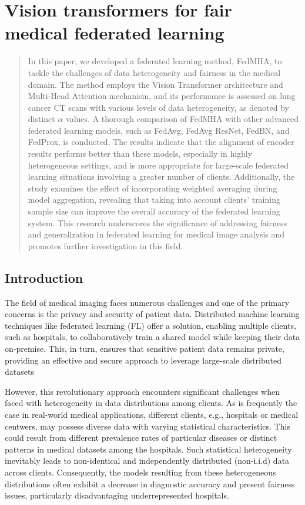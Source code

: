 


\chapter{Vision transformers for fair medical federated learning }



\begin{abstract}
In this paper, we developed a federated learning method, FedMHA, to tackle the challenges of data heterogeneity and fairness in the medical domain. The method employs the Vision Transformer architecture and Multi-Head Attention mechanism, and its performance is assessed on lung cancer CT scans with various levels of data heterogeneity, as denoted by distinct $\alpha$ values. A thorough comparison of FedMHA with other advanced federated learning models, such as FedAvg, FedAvg ResNet, FedBN, and FedProx, is conducted. The results indicate that the alignment of encoder results performs better than these models, especially in highly heterogeneous settings, and is more appropriate for large-scale federated learning situations involving a greater number of clients. Additionally, the study examines the effect of incorporating weighted averaging during model aggregation, revealing that taking into account clients' training sample size can improve the overall accuracy of the federated learning system. This research underscores the significance of addressing fairness and generalization in federated learning for medical image analysis and promotes further investigation in this field.
\end{abstract}


\newpage
\section{Introduction}

The field of medical imaging faces numerous challenges and one of the primary concerns is the privacy and security of patient data. Distributed machine learning techniques like federated learning (FL) offer a solution, enabling multiple clients, such as hospitals, to collaboratively train a shared model while keeping their data on-premise. This, in turn, ensures that sensitive patient data remains private, providing an effective and secure approach to leverage large-scale distributed datasets

However, this revolutionary approach encounters significant challenges when faced with heterogeneity in data distributions among clients. As is frequently the case in real-world medical applications, different clients, e.g., hospitals or medical centwers, may possess diverse data with varying statistical characteristics. This could result from different prevalence rates of particular diseases or distinct patterns in medical datasets among the hospitals. Such statistical heterogeneity inevitably leads to non-identical and independently distributed (non-i.i.d) data across clients. Consequently, the models resulting from these heterogeneous distributions often exhibit a decrease in diagnostic accuracy and present fairness issues, particularly disadvantaging underrepresented hospitals.

